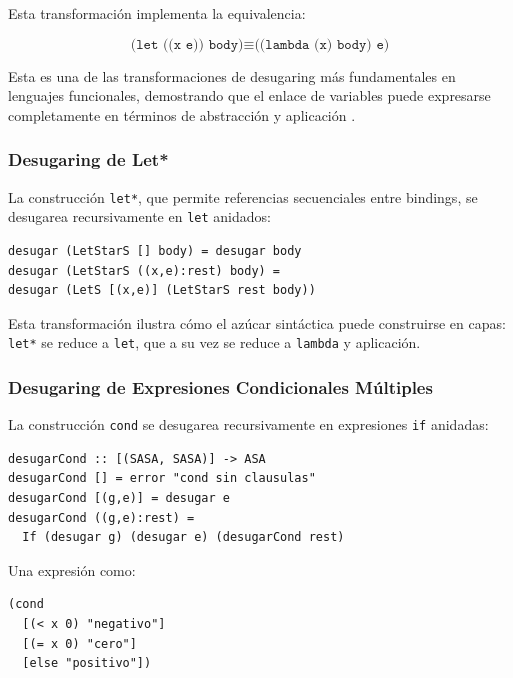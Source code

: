 \documentclass[a4paper,12pt]{article}
\begin{document}
Esta transformación implementa la equivalencia:

\begin{equation*}
\texttt{(let ((x e)) body)} \equiv \texttt{((lambda (x) body) e)}
\end{equation*}

Esta es una de las transformaciones de desugaring más fundamentales en lenguajes funcionales, demostrando que el enlace de variables puede expresarse completamente en términos de abstracción y aplicación \cite{Rathi2020,Serokell2020}.

\subsubsection{Desugaring de Let*}

La construcción \texttt{let*}, que permite referencias secuenciales entre bindings, se desugarea recursivamente en \texttt{let} anidados:

\begin{lstlisting}[style=haskellstyle, caption={Desugaring de let*}]
desugar (LetStarS [] body) = desugar body
desugar (LetStarS ((x,e):rest) body) =
desugar (LetS [(x,e)] (LetStarS rest body))
\end{lstlisting}

Esta transformación ilustra cómo el azúcar sintáctica puede construirse en capas: \texttt{let*} se reduce a \texttt{let}, que a su vez se reduce a \texttt{lambda} y aplicación.

\subsubsection{Desugaring de Expresiones Condicionales Múltiples}

La construcción \texttt{cond} se desugarea recursivamente en expresiones \texttt{if} anidadas:

\begin{lstlisting}[style=haskellstyle, caption={Desugaring de cond}]
desugarCond :: [(SASA, SASA)] -> ASA
desugarCond [] = error "cond sin clausulas"
desugarCond [(g,e)] = desugar e
desugarCond ((g,e):rest) = 
  If (desugar g) (desugar e) (desugarCond rest)
\end{lstlisting}

Una expresión como:

\begin{lstlisting}[style=haskellstyle]
(cond 
  [(< x 0) "negativo"]
  [(= x 0) "cero"]
  [else "positivo"])
\end{lstlisting}
\end{document}
